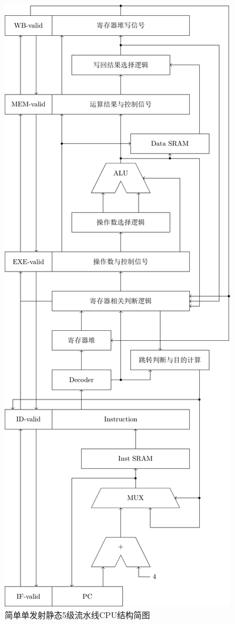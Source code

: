 \documentclass[UTF-8,twoside,c5size]{ctexart}
\begin{document}
	\begin{figure}[p]
		\centering
		\includegraphics*[height=0.95\textheight]{figure-lab5.pdf}
		\caption{简单单发射静态5级流水线CPU结构简图}
	\end{figure}
	
\end{document}

